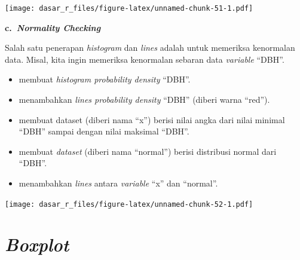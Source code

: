 \documentclass[
  12pt,
  a4paper,
]{scrbook}
\newenvironment{Shaded}{\begin{snugshade}}{\end{snugshade}}
\newcommand{\CommentTok}[1]{\textcolor[rgb]{0.56,0.35,0.01}{\textit{#1}}}
\newcommand{\DataTypeTok}[1]{\textcolor[rgb]{0.13,0.29,0.53}{#1}}
\newcommand{\KeywordTok}[1]{\textcolor[rgb]{0.13,0.29,0.53}{\textbf{#1}}}
\newcommand{\NormalTok}[1]{#1}
\newcommand{\OperatorTok}[1]{\textcolor[rgb]{0.81,0.36,0.00}{\textbf{#1}}}
\newcommand{\StringTok}[1]{\textcolor[rgb]{0.31,0.60,0.02}{#1}}
\providecommand{\tightlist}{%
  \setlength{\itemsep}{0pt}\setlength{\parskip}{0pt}}
\begin{document}
\texttt{[image: dasar\_r\_files/figure-latex/unnamed-chunk-51-1.pdf]}

\textbf{c.~\emph{Normality Checking}}

Salah satu penerapan \emph{histogram} dan \emph{lines} adalah untuk
memeriksa kenormalan data. Misal, kita ingin memeriksa kenormalan
sebaran data \emph{variable} ``DBH''.

\begin{itemize}
\tightlist
\item
  membuat \emph{histogram probability density} ``DBH''.
\item
  menambahkan \emph{lines probability density} ``DBH'' (diberi warna
  ``red'').
\item
  membuat dataset (diberi nama ``x'') berisi nilai angka dari nilai
  minimal ``DBH'' sampai dengan nilai maksimal ``DBH''.
\item
  membuat \emph{dataset} (diberi nama ``normal'') berisi distribusi
  normal dari ``DBH''.
\item
  menambahkan \emph{lines} antara \emph{variable} ``x'' dan ``normal''.
\end{itemize}

\begin{Shaded}
\end{Shaded}

\texttt{[image: dasar\_r\_files/figure-latex/unnamed-chunk-52-1.pdf]}

\hypertarget{boxplot}{%
\section{\texorpdfstring{\emph{Boxplot}}{Boxplot}}\label{boxplot}}
\end{document}

